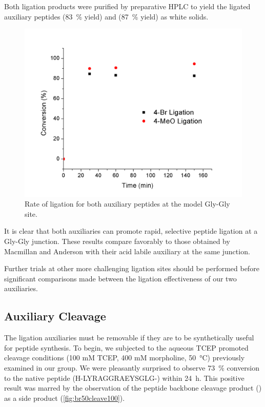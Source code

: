     Both ligation products were purified by preparative HPLC to yield the ligated auxiliary peptides  (\SI{83}{\percent} yield) and  (\SI{87}{\percent} yield) as white solids.

    \begin{figure}[!htpb]
        \includegraphics[max width=\textwidth]{combinedligation.png}
        \caption{Rate of ligation for both auxiliary peptides at the model Gly-Gly site.}
    \end{figure}

    It is clear that both auxiliaries can promote rapid, selective peptide ligation at a Gly-Gly junction. These results compare favorably to those obtained by Macmillan and Anderson with their acid labile auxiliary  at the same junction\cite{macmillan_rapid_2004}.

    Further trials at other more challenging ligation sites should be performed before significant comparisons  made between the ligation effectiveness of our two auxiliaries.

  \subsection{Auxiliary Cleavage}

    The ligation auxiliaries must be removable if they are to be synthetically useful for peptide synthesis. To begin, we subjected  to the aqueous TCEP promoted cleavage conditions (100 mM TCEP, 400 mM morpholine, \SI{50}{\celsius}) previously examined in our group. We were pleasantly surprised to observe \SI{73}{\percent} conversion to the native peptide  (H-LYRAGGRAEYSGLG-) within \SI{24}{\hour}. This positive result was marred by the observation of the peptide backbone cleavage product  () as a side product (\ref{fig:br50cleave100}).

